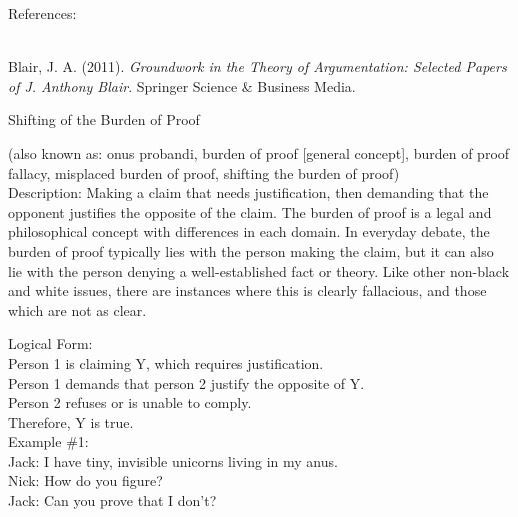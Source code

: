 \documentclass[a4paper,12pt,single,pdftex]{scrartcl}
\begin{document}
    References:

    
      
        
      \\

      
        
          Blair, J. A. (2011). {\it Groundwork in the Theory of Argumentation: Selected Papers of J. Anthony Blair}. Springer Science \& Business Media.
        
      
    
  

Shifting of the Burden of Proof
    
      (also known as: onus probandi, burden of proof [general concept], burden of proof fallacy, misplaced burden of proof, shifting the burden of proof)
    \\

  
    Description: Making a claim that needs justification, then demanding that the opponent justifies the opposite of the claim. The burden of proof is a legal and philosophical concept with differences in each domain. In everyday debate, the burden of proof typically lies with the person making the claim, but it can also lie with the person denying a well-established fact or theory. Like other non-black and white issues, there are instances where this is clearly fallacious, and those which are not as clear.

    
      Logical Form:
    \\

    
      Person 1 is claiming Y, which requires justification.
    \\

    
      Person 1 demands that person 2 justify the opposite of Y.
    \\

    
      Person 2 refuses or is unable to comply.
    \\

    
      Therefore, Y is true.
    \\

    
      Example \#1:
    \\

    
      Jack: I have tiny, invisible unicorns living in my anus.
    \\

    
      Nick: How do you figure?
    \\

    
      Jack: Can you prove that I don't?
    \\
\end{document}
